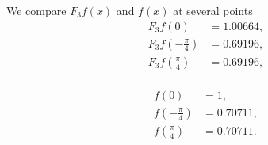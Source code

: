 \documentclass[11pt]{article}
\begin{document}
\begin{solution}
We compare $F_3f(x)$ and $f(x)$ at several points 
\begin{align*}
F_3f(0) &= 1.00664,\\
F_3f\left(-\frac{\pi}{4}\right) &= 0.69196,\\
F_3f\left(\frac{\pi}{4}\right) &= 0.69196,\\
\end{align*}

\begin{align*}
f(0) &= 1,\\
f\left(-\frac{\pi}{4}\right) &= 0.70711,\\
f\left(\frac{\pi}{4}\right) &= 0.70711.\\
\end{align*}

\end{solution}
\end{document}
